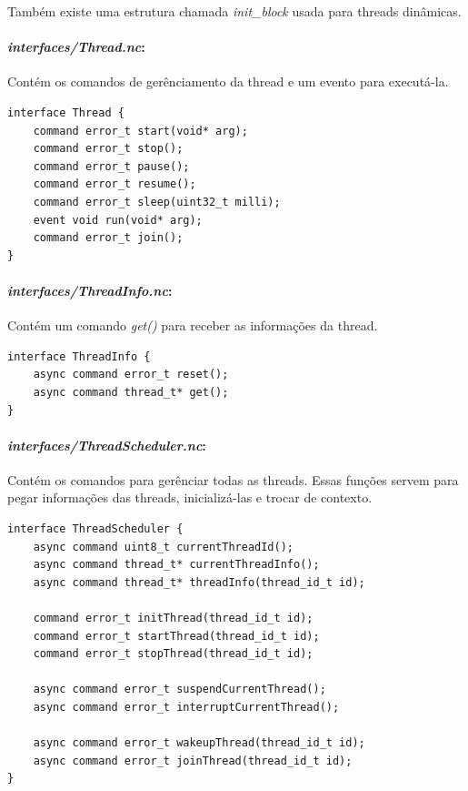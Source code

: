 Também existe uma estrutura chamada \textit{init\_block} usada para threads dinâmicas.

\paragraph{\textit{interfaces/Thread.nc}:} Contém os comandos de gerênciamento da thread e um evento para executá-la.
\begin{lstlisting}
interface Thread {
    command error_t start(void* arg);
    command error_t stop();
    command error_t pause();
    command error_t resume();
    command error_t sleep(uint32_t milli);
    event void run(void* arg);
    command error_t join();
}  
\end{lstlisting}

\paragraph{\textit{interfaces/ThreadInfo.nc}:} Contém um comando \textit{get()} para receber as informações da thread.
\begin{lstlisting}
interface ThreadInfo {
    async command error_t reset();
    async command thread_t* get();
} 
\end{lstlisting}

\paragraph{\textit{interfaces/ThreadScheduler.nc}:} Contém os comandos para gerênciar todas as threads. Essas funções
servem para pegar informações das threads, inicializá-las e trocar de contexto.
\begin{lstlisting}
interface ThreadScheduler {
    async command uint8_t currentThreadId();
    async command thread_t* currentThreadInfo();
    async command thread_t* threadInfo(thread_id_t id);

    command error_t initThread(thread_id_t id);
    command error_t startThread(thread_id_t id);
    command error_t stopThread(thread_id_t id);

    async command error_t suspendCurrentThread();
    async command error_t interruptCurrentThread();

    async command error_t wakeupThread(thread_id_t id);
    async command error_t joinThread(thread_id_t id);
}
\end{lstlisting}

